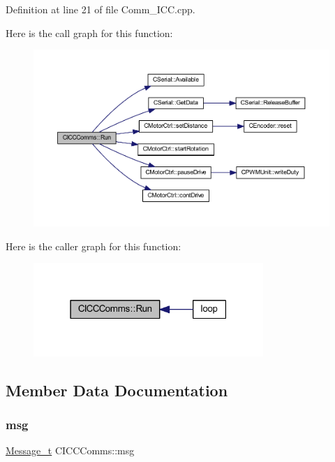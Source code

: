 Definition at line 21 of file Comm\+\_\+\+I\+C\+C.\+cpp.

Here is the call graph for this function\+:
\nopagebreak
\begin{figure}[H]
\begin{center}
\leavevmode
\includegraphics[width=350pt]{class_c_i_c_c_comms_a8b3fa81307b3b9ba0e72b4aee8279c56_cgraph}
\end{center}
\end{figure}
Here is the caller graph for this function\+:
\nopagebreak
\begin{figure}[H]
\begin{center}
\leavevmode
\includegraphics[width=247pt]{class_c_i_c_c_comms_a8b3fa81307b3b9ba0e72b4aee8279c56_icgraph}
\end{center}
\end{figure}


\subsection{Member Data Documentation}
\mbox{\label{class_c_i_c_c_comms_a35a59d11110d830b70ab5e2a5644bbb9}} 
\subsubsection{\texorpdfstring{msg}{msg}}
{\footnotesize\ttfamily \mbox{\hyperlink{struct_c_i_c_c_comms_1_1_message__t}{Message\+\_\+t}} C\+I\+C\+C\+Comms\+::msg}



